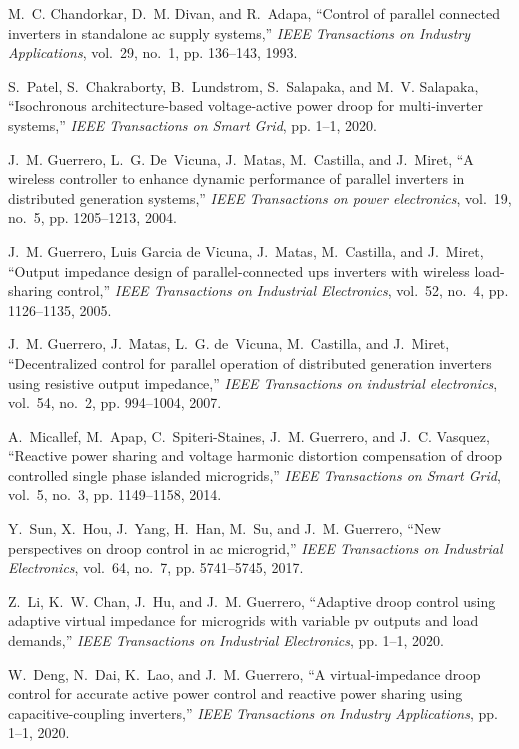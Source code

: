 \documentclass[journal]{IEEEtran}
\begin{document}
\begin{thebibliography}{10}
	M.~C. {Chandorkar}, D.~M. {Divan}, and R.~{Adapa}, ``Control of parallel
	connected inverters in standalone ac supply systems,'' \emph{IEEE
		Transactions on Industry Applications}, vol.~29, no.~1, pp. 136--143, 1993.
	
	S.~{Patel}, S.~{Chakraborty}, B.~{Lundstrom}, S.~{Salapaka}, and M.~V.
	{Salapaka}, ``Isochronous architecture-based voltage-active power droop for
	multi-inverter systems,'' \emph{IEEE Transactions on Smart Grid}, pp. 1--1,
	2020.
	
	J.~M. Guerrero, L.~G. De~Vicuna, J.~Matas, M.~Castilla, and J.~Miret, ``A
	wireless controller to enhance dynamic performance of parallel inverters in
	distributed generation systems,'' \emph{IEEE Transactions on power
		electronics}, vol.~19, no.~5, pp. 1205--1213, 2004.
	
	J.~M. {Guerrero}, {Luis Garcia de Vicuna}, J.~{Matas}, M.~{Castilla}, and
	J.~{Miret}, ``Output impedance design of parallel-connected ups inverters
	with wireless load-sharing control,'' \emph{IEEE Transactions on Industrial
		Electronics}, vol.~52, no.~4, pp. 1126--1135, 2005.
	
	J.~M. Guerrero, J.~Matas, L.~G. de~Vicuna, M.~Castilla, and J.~Miret,
	``Decentralized control for parallel operation of distributed generation
	inverters using resistive output impedance,'' \emph{IEEE Transactions on
		industrial electronics}, vol.~54, no.~2, pp. 994--1004, 2007.
	
	A.~Micallef, M.~Apap, C.~Spiteri-Staines, J.~M. Guerrero, and J.~C. Vasquez,
	``Reactive power sharing and voltage harmonic distortion compensation of
	droop controlled single phase islanded microgrids,'' \emph{IEEE Transactions
		on Smart Grid}, vol.~5, no.~3, pp. 1149--1158, 2014.
	
	Y.~Sun, X.~Hou, J.~Yang, H.~Han, M.~Su, and J.~M. Guerrero, ``New perspectives
	on droop control in ac microgrid,'' \emph{IEEE Transactions on Industrial
		Electronics}, vol.~64, no.~7, pp. 5741--5745, 2017.
	
	Z.~{Li}, K.~W. {Chan}, J.~{Hu}, and J.~M. {Guerrero}, ``Adaptive droop control
	using adaptive virtual impedance for microgrids with variable pv outputs and
	load demands,'' \emph{IEEE Transactions on Industrial Electronics}, pp. 1--1,
	2020.
	
	W.~{Deng}, N.~{Dai}, K.~{Lao}, and J.~M. {Guerrero}, ``A virtual-impedance
	droop control for accurate active power control and reactive power sharing
	using capacitive-coupling inverters,'' \emph{IEEE Transactions on Industry
		Applications}, pp. 1--1, 2020.
	

\end{thebibliography}
\end{document}
